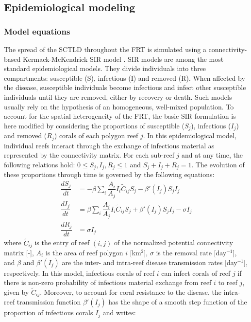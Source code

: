 \documentclass[utf8]{frontiersSCNS}
\begin{document}
\subsection{Epidemiological modeling}
\subsubsection{Model equations}
The spread of the SCTLD throughout the FRT is simulated using a connectivity-based Kermack-McKendrick SIR model \citep{brauer2008compartmental}. SIR models are among the most standard epidemiological models. They divide individuals into three compartments: susceptible (S), infectious (I) and removed (R). When affected by the disease, susceptible individuals become infectious and infect other susceptible individuals until they are removed, either by recovery or death. Such models usually rely on the hypothesis of an homogeneous, well-mixed population. To account for the spatial heterogeneity of the FRT, the basic SIR formulation is here modified by considering the proportions of susceptible ($S_j$), infectious ($I_j$) and removed ($R_j$) corals of each polygon reef $j$. In this epidemiological model, individual reefs interact through the exchange of infectious material as represented by the connectivity matrix. For each sub-reef $j$ and at any time, the following relations hold: $0\leq S_j,I_j,R_j\leq 1$ and $S_j+I_j+R_j=1$. The evolution of these proportions through time is governed by the following equations:
\begin{equation}
    \begin{aligned}
        \dfrac{dS_j}{dt} &= -\beta\sum_i\dfrac{A_i}{A_j}I_i\tilde{C}_{ij}S_j - \beta'(I_j)S_jI_j \\
        \dfrac{dI_j}{dt} &= \beta\sum_i\dfrac{A_i}{A_j}I_i\tilde{C}_{ij}S_j + \beta'(I_j)S_jI_j - \sigma I_j \\
        \dfrac{dR_j}{dt} &= \sigma I_j
    \end{aligned}\label{eq:epidemio}
\end{equation}
where $\tilde{C}_{ij}$ is the entry of reef $(i,j)$ of the normalized potential connectivity matrix [-], $A_i$ is the area of reef polygon $i$ [km$^2$], $\sigma$ is the removal rate [day$^{-1}$], and $\beta$ and $\beta'(I_j)$ are the inter- and intra-reef disease transmission rates [day$^{-1}$], respectively. In this model, infectious corals of reef $i$ can infect corals of reef $j$ if there is non-zero probability of infectious material exchange from reef $i$ to reef $j$, given by $\tilde{C}_{ij}$. Moreover, to account for coral resistance to the disease, the intra-reef transmission function $\beta'(I_j)$ has the shape of a smooth step function of the proportion of infectious corals $I_j$ and writes:
\end{document}
